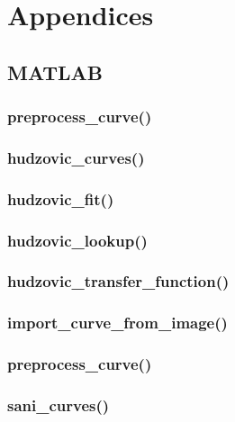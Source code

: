 \section{Appendices}

\subsection{MATLAB}

\subsubsection{preprocess\_curve()}


\subsubsection{hudzovic\_curves()}


\subsubsection{hudzovic\_fit()}


\subsubsection{hudzovic\_lookup()}


\subsubsection{hudzovic\_transfer\_function()}


\subsubsection{import\_curve\_from\_image()}


\subsubsection{preprocess\_curve()}


\subsubsection{sani\_curves()}


